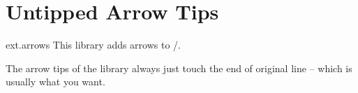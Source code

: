 %
%
%

\section{Untipped Arrow Tips}
\label{pgflibrary:arrows}
\tikzset{external/export/.try=false}%
\begin{pgflibrary}{ext.arrows}
  This library adds arrows to \pgfname/\tikzname.
\end{pgflibrary}
\begin{multicols}{2}
The arrow tips of the  library always
just touch the end of original line -- which is usually
what you want.


\end{multicols}
